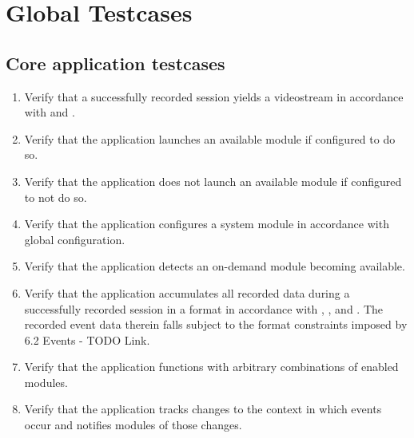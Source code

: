 \chapter{Global Testcases}
\label{ch:tests}

\newcommand{\testfor}[1]{\addtocounter{counterTC}{10}\item[TC\arabic{counterTC}\label{TC\arabic{counterTC}}\\\begin{footnotesize}\textit{(tests \specref{#1})}\end{footnotesize}]}
\newcommand{\test}{\addtocounter{counterTC}{10}\item[TC\arabic{counterTC}\label{TC\arabic{counterTC}}]}
\newenvironment{tests}{\begin{enumerate}[font = \normalfont, style = multiline, labelindent = 0em, labelwidth = 5em, labelsep* = 1em, leftmargin = !]}{\end{enumerate}}

\section{Core application testcases}

\begin{tests}
    \testfor{FS100}{Verify that a successfully recorded \gls{session} yields a \gls{videostream} in accordance with  and .}
    \testfor{FS110}{Verify that the application launches an available \gls{module} if configured to do so.}
    \testfor{FS110}{Verify that the application does not launch an available \gls{module} if configured to not do so.}
    \testfor{FS120}{Verify that the application configures a system \gls{module} in accordance with global configuration.}
    \testfor{FS130}{Verify that the application detects an on-demand \gls{module} becoming available.}
    \testfor{FS140}{Verify that the application accumulates all recorded data during a successfully recorded \gls{session} in a format in accordance with , ,  and . The recorded event data therein falls subject to the format constraints imposed by 6.2 Events - TODO Link.}%
    \testfor{FS150}{Verify that the application functions with arbitrary combinations of enabled \glspl{module}.}
    \testfor{FS160}{Verify that the application tracks changes to the context in which events occur and notifies \glspl{module} of those changes.}
\end{tests}

